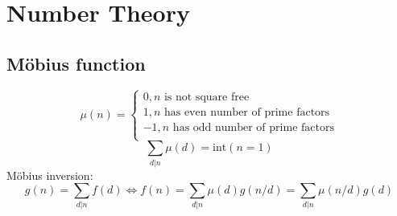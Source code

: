 \chapter{Number Theory}

\section{Möbius function}
$$\mu(n) = 
	\begin{cases}
		0, n \text{ is not square free}\\
		1, n \text{ has even number of prime factors}\\
		-1, n \text{ has odd number of prime factors}\\
	\end{cases}
$$
$$\sum_{d | n} \mu(d) = \text{int}(n = 1)$$
Möbius inversion:
$$g(n) = \sum_{d | n} f(d) \iff f(n) = \sum_{d | n} \mu(d) g(n / d) = \sum_{d | n} \mu(n / d) g(d)$$
